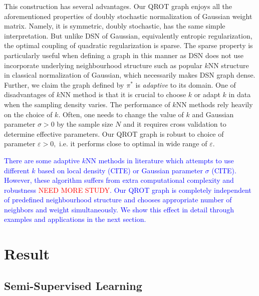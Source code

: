 \documentclass{article}
\newcommand{\red}[1]{\textcolor{red}{#1}}
\newcommand{\blue}[1]{\textcolor{blue}{#1}}
\begin{document}
This construction has several advantages.
Our QROT graph enjoys all the aforementioned properties of doubly stochastic normalization of Gaussian weight matrix. 
Namely, it is symmetric, doubly stochastic, has the same simple interpretation. 
But unlike DSN of Gaussian, equivalently entropic regularization, the optimal coupling of quadratic regularization is sparse. 
The sparse property is particularly useful when defining a graph in this manner as DSN does not use incorporate underlying neighbourhood structure such as popular $k$NN structure in classical normalization of Gaussian, which necessarily makes DSN graph dense. 
Further, we claim the graph defined by $\pi^*$ is \textit{adaptive} to its domain. 
One of disadvantages of $k$NN method is that it is crucial to choose $k$ or adapt $k$ in data when the sampling density varies. 
The performance of $k$NN methods rely heavily on the choice of $k.$
Often, one needs to change the value of $k$ and Gaussian parameter $\sigma>0$ by the sample size $N$ and it requires cross validation to determine effective parameters.
Our QROT graph is robust to choice of parameter $\varepsilon>0,$ i.e. it performs close to optimal in wide range of $\varepsilon.$

\blue{There are some adaptive $k$NN methods in literature which attempts to use different $k$ based on local density (CITE) or Gaussian parameter $\sigma$ (CITE).
However, these algorithm suffers from extra computational complexity and robustness \red{NEED MORE STUDY}.
Our QROT graph is completely independent of predefined neighbourhood structure and chooses appropriate number of neighbors and weight simultaneously. 
We show this effect in detail through examples and applications in the next section.
}
\section{Result}

\subsection{Semi-Supervised Learning}\label{sec:SSL}
\end{document}
